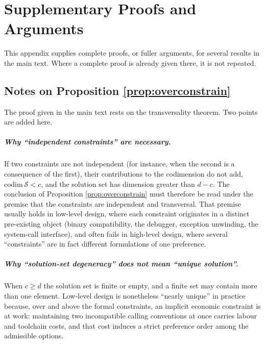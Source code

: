 \appendix

\chapter{Supplementary Proofs and Arguments}\label{app:proofs}

This appendix supplies complete proofs, or fuller arguments, for several results in the
main text. Where a complete proof is already given there, it is not repeated.

\section{Notes on Proposition \ref{prop:overconstrain}}

The proof given in the main text rests on the transversality theorem. Two points are added
here.

\paragraph{Why ``independent constraints'' are necessary.}
If two constraints are not independent (for instance, when the second is a consequence of
the first), their contributions to the codimension do not add,
$\mathrm{codim}\,\mathcal{S} < c$, and the solution set has dimension greater than
$d - c$. The conclusion of Proposition \ref{prop:overconstrain} must therefore be read
under the premise that the constraints are independent and transversal. That premise
usually holds in low-level design, where each constraint originates in a distinct
pre-existing object (binary compatibility, the debugger, exception unwinding, the
system-call interface), and often fails in high-level design, where several
``constraints'' are in fact different formulations of one preference.

\paragraph{Why ``solution-set degeneracy'' does not mean ``unique solution''.}
When $c \ge d$ the solution set is finite or empty, and a finite set may contain more than
one element. Low-level design is nonetheless ``nearly unique'' in practice because, over
and above the formal constraints, an implicit economic constraint is at work: maintaining
two incompatible calling conventions at once carries labour and toolchain costs, and that
cost induces a strict preference order among the admissible options.

